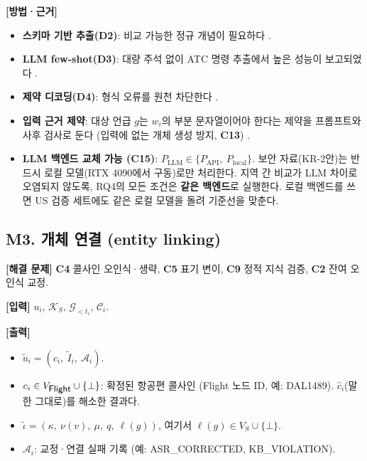 \documentclass[10pt,a4paper]{article}
\newcommand{\G}{\mathcal{G}}
\newcommand{\KS}{\mathcal{K}_S}
\newcommand{\Ctx}{\mathcal{C}}
\newcommand{\cmd}[1]{\textsf{\small #1}}
\newcommand{\ch}[1]{\textbf{\textcolor{red!60!black}{#1}}}
\begin{document}
\textbf{[방법·근거]}
\begin{itemize}
\item \textbf{스키마 기반 추출(D2)}: 비교 가능한 정규 개념이 필요하다 \cite{feng2024,llmkgc2025}.
\item \textbf{LLM few-shot(D3)}: 대량 주석 없이 ATC 명령 추출에서 높은 성능이 보고되었다 \cite{mekerishvili2025}.
\item \textbf{제약 디코딩(D4)}: 형식 오류를 원천 차단한다 \cite{willard2023}.
\item \textbf{입력 근거 제약}: 대상 언급 $g$는 $w_i$의 부분 문자열이어야 한다는 제약을 프롬프트와 사후 검사로 둔다 (입력에 없는 개체 생성 방지, \ch{C13}) \cite{itext2kg}.
\item \textbf{LLM 백엔드 교체 가능 (\ch{C15})}: $P_{\mathrm{LLM}}\in\{P_{\mathrm{API}},\ P_{\mathrm{local}}\}$. 보안 자료(KR-2안)는 반드시 로컬 모델(RTX 4090에서 구동)로만 처리한다. 지역 간 비교가 LLM 차이로 오염되지 않도록, RQ4의 모든 조건은 \textbf{같은 백엔드}로 실행한다. 로컬 백엔드를 쓰면 US 검증 세트에도 같은 로컬 모델을 돌려 기준선을 맞춘다.
\end{itemize}

\subsection{M3. 개체 연결 (entity linking)}
\textbf{[해결 문제]} \ch{C4} 콜사인 오인식·생략, \ch{C5} 표기 변이, \ch{C9} 정적 지식 검증, \ch{C2} 잔여 오인식 교정.

\textbf{[입력]} $u_i$, $\KS$, $\G_{<t_i}$, $\Ctx_i$.

\textbf{[출력]}
\begin{itemize}
\item $\tilde u_i = (c_i,\ \tilde I_i,\ \mathcal{A}_i)$.
\item $c_i\in V_{\cmd{Flight}}\cup\{\bot\}$: 확정된 항공편 콜사인 (Flight 노드 ID, 예: \cmd{DAL1489}). $\hat c_i$(말한 그대로)를 해소한 결과다.
\item $\tilde\iota = (\kappa,\ \nu(v),\ \mu,\ q,\ \ell(g))$, 여기서 $\ell(g)\in V_S\cup\{\bot\}$.
\item $\mathcal{A}_i$: 교정·연결 실패 기록 (예: \cmd{ASR\_CORRECTED}, \cmd{KB\_VIOLATION}).
\end{itemize}
\end{document}
